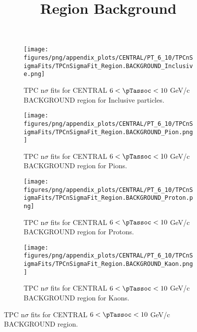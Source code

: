             \begin{figure}[H]
                \title{Region Background}
                \begin{subfigure}[b]{0.5\textwidth}
                    \centering
                    \texttt{[image: figures/png/appendix\_plots/CENTRAL/PT\_6\_10/TPCnSigmaFits/TPCnSigmaFit\_Region.BACKGROUND\_Inclusive.png]}
                    \caption{TPC n$\sigma$ fits for CENTRAL $6 < \pTassoc < 10$ GeV/c BACKGROUND region for Inclusive particles.}
                    \label{fig:appendix_CENTRAL_$6 < \pTassoc < 10$ GeV/c_BACKGROUND_Inclusive}
                \end{subfigure}
                \begin{subfigure}[b]{0.5\textwidth}
                    \centering
                    \texttt{[image: figures/png/appendix\_plots/CENTRAL/PT\_6\_10/TPCnSigmaFits/TPCnSigmaFit\_Region.BACKGROUND\_Pion.png]}
                    \caption{TPC n$\sigma$ fits for CENTRAL $6 < \pTassoc < 10$ GeV/c BACKGROUND region for Pions.}
                    \label{fig:appendix_CENTRAL_$6 < \pTassoc < 10$ GeV/c_BACKGROUND_Pion}
                \end{subfigure}
                \begin{subfigure}[b]{0.5\textwidth}
                    \centering
                    \texttt{[image: figures/png/appendix\_plots/CENTRAL/PT\_6\_10/TPCnSigmaFits/TPCnSigmaFit\_Region.BACKGROUND\_Proton.png]}
                    \caption{TPC n$\sigma$ fits for CENTRAL $6 < \pTassoc < 10$ GeV/c BACKGROUND region for Protons.}
                    \label{fig:appendix_CENTRAL_$6 < \pTassoc < 10$ GeV/c_BACKGROUND_Proton}
                \end{subfigure}
                \begin{subfigure}[b]{0.5\textwidth}
                    \centering
                    \texttt{[image: figures/png/appendix\_plots/CENTRAL/PT\_6\_10/TPCnSigmaFits/TPCnSigmaFit\_Region.BACKGROUND\_Kaon.png]}
                    \caption{TPC n$\sigma$ fits for CENTRAL $6 < \pTassoc < 10$ GeV/c BACKGROUND region for Kaons.}
                    \label{fig:appendix_CENTRAL_$6 < \pTassoc < 10$ GeV/c_BACKGROUND_Kaon}
                \end{subfigure}
                \caption{TPC n$\sigma$ fits for CENTRAL $6 < \pTassoc < 10$ GeV/c BACKGROUND region.}
                \label{fig:appendix_CENTRAL_$6 < \pTassoc < 10$ GeV/c_BACKGROUND}
            \end{figure}
            \clearpage
            
